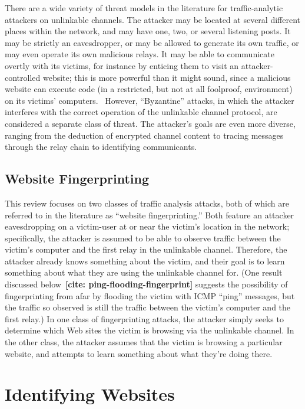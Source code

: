 \documentclass{zarticle}
\def\todo#1{{\color{todocolor}\bfseries [#1]}}
\def\needcite#1{\todo{cite: #1}}
\begin{document}
There are a wide variety of threat models in the literature for
traffic-analytic attackers on unlinkable channels.  The attacker may
be located at several different places within the network, and may
have one, two, or several listening posts.  It may be strictly an
eavesdropper, or may be allowed to generate its own traffic, or may
even operate its own malicious relays.  It may be able to communicate
overtly with its victims, for instance by enticing them to visit an
attacker-controlled website; this is more powerful than it might
sound, since a malicious website can execute code (in a restricted,
but not at all foolproof, environment) on its victims'
computers.~\cite{barth2008securing} However, “Byzantine” attacks, in
which the attacker interferes with the correct operation of the
unlinkable channel protocol, are considered a separate class of
threat.  The attacker's goals are even more diverse, ranging from
the deduction of encrypted channel content to tracing messages through
the relay chain to identifying communicants.

\subsection{Website Fingerprinting}

This review focuses on two classes of traffic analysis attacks, both
of which are referred to in the literature as “website
fingerprinting.”  Both feature an attacker eavesdropping on a
victim-user at or near the victim's location in the network;
specifically, the attacker is assumed to be able to observe traffic
between the victim's computer and the first relay in the unlinkable
channel.  Therefore, the attacker already knows something about the
victim, and their goal is to learn something about what they are using
the unlinkable channel for.  (One result discussed
below~\needcite{ping-flooding-fingerprint} suggests the possibility of
fingerprinting from afar by flooding the victim with ICMP “ping”
messages, but the traffic so observed is still the traffic between the
victim's computer and the first relay.)  In one class of
fingerprinting attacks, the attacker simply seeks to determine which
Web sites the victim is browsing via the unlinkable channel.  In the
other class, the attacker assumes that the victim is browsing a
particular website, and attempts to learn something about what they're
doing there.

\section{Identifying Websites}
\end{document}
